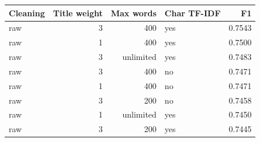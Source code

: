 \begin{tabular}{lrrlr}
\toprule
Cleaning & Title weight & Max words & Char TF-IDF & F1 \\
\midrule
raw & 3 & 400 & yes & 0.7543 \\
raw & 1 & 400 & yes & 0.7500 \\
raw & 3 & unlimited & yes & 0.7483 \\
raw & 3 & 400 & no & 0.7471 \\
raw & 1 & 400 & no & 0.7471 \\
raw & 3 & 200 & no & 0.7458 \\
raw & 1 & unlimited & yes & 0.7450 \\
raw & 3 & 200 & yes & 0.7445 \\
\bottomrule
\end{tabular}
